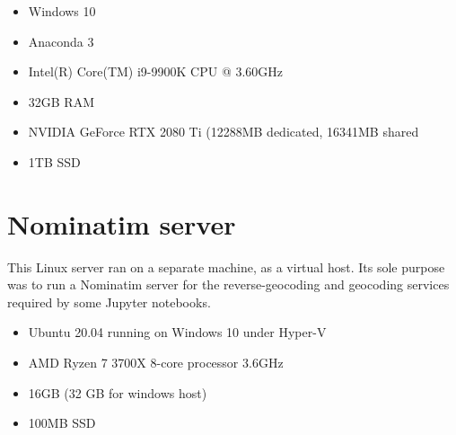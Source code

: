 \documentclass[11pt,twoside]{report}
\begin{document}
\begin{itemize}
\item{Windows 10}
\item{Anaconda 3}
\item{Intel(R) Core(TM) i9-9900K CPU @ 3.60GHz}	
\item{32GB RAM}
\item{NVIDIA GeForce RTX 2080 Ti (12288MB dedicated, 16341MB shared}
\item{1TB SSD}
\end{itemize}


\section{Nominatim server}
\label{a:nominatim}

This Linux server ran on a separate machine, as a virtual host.  Its sole purpose was to run a Nominatim server for the reverse-geocoding and geocoding services required by some Jupyter notebooks.

\begin{itemize}
\item{Ubuntu 20.04 running on Windows 10 under Hyper-V}
\item{AMD Ryzen 7 3700X 8-core processor 3.6GHz}
\item{16GB (32 GB for windows host)}
\item{100MB SSD}
\end{itemize}


\cleardoublepage


\end{document}
